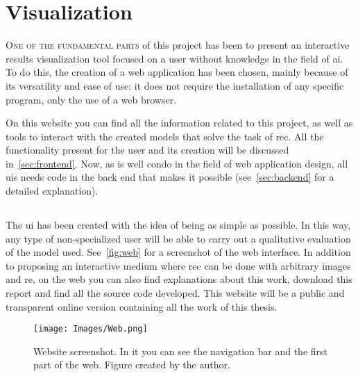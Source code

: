 

\chapter{Visualization}\label{cha:web}



\lettrine{O}{ne of the fundamental parts} of this project has been to present
an interactive results visualization tool focused on a user without knowledge
in the field of \gls{ai}. To do this, the creation of a web application has
been chosen, mainly because of its versatility and ease of use: it does not
require the installation of any specific program, only the use of a web
browser.

On this website you can find all the information related to this project, as
well as tools to interact with the created models that solve the task of
\gls{rec}. All the functionality present for the user and its creation will be
discussed in\ \vref{sec:frontend}. Now, as is well condo in the field of web
application design, all \glspl{ui} needs code in the back end that makes it
possible (see\ \vref{sec:backend} for a detailed explanation).



\section{}%
\label{sec:frontend}

The \gls{ui} has been created with the idea of being as simple as possible. In
this way, any type of non-specialized user will be able to carry out a
qualitative evaluation of the model used. See\ \vref{fig:web} for a screenshot
of the web interface. In addition to proposing an interactive medium where
\gls{rec} can be done with arbitrary images and \gls{re}, on the web you can
also find explanations about this work, download this report and find all the
source code developed. This website will be a public and transparent online
version containing all the work of this thesis.

\begin{figure}[ht]
  \centering
  \texttt{[image: Images/Web.png]}
  \caption[Website screenshot]{Website screenshot. In it you can see the
    navigation bar and the first part of the web. Figure created by the
    author.}%
  \label{fig:web}
\end{figure}

